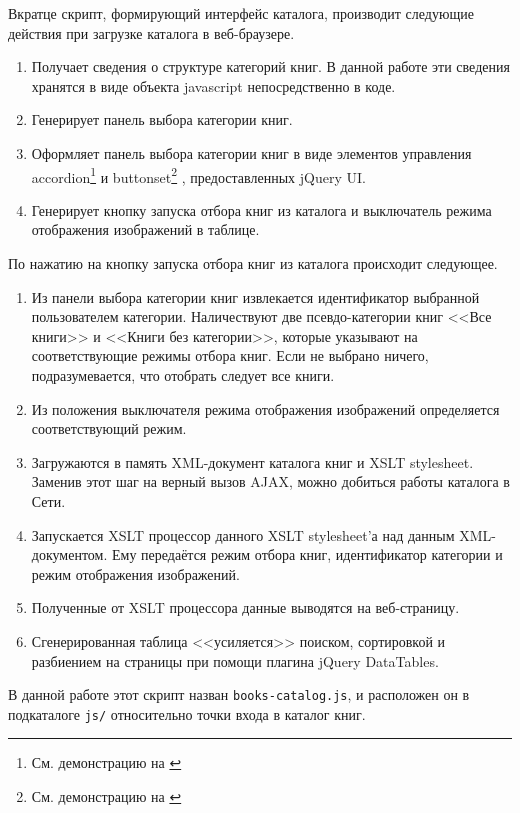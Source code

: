 \documentclass[a4paper,14pt,oneside]{extreport}
\begin{document}
Вкратце скрипт, формирующий интерфейс каталога, производит следующие действия при загрузке каталога в веб-браузере.
\begin{enumerate}
\item Получает сведения о структуре категорий книг. В данной работе эти сведения хранятся в виде объекта javascript непосредственно в коде.
\item Генерирует панель выбора категории книг.
\item Оформляет панель выбора категории книг в виде элементов управления accordion\footnote{См. демонстрацию на \cite{jQueryUI-accordion}} и buttonset\footnote{См. демонстрацию на \cite{jQueryUI-buttonset}} , предоставленных jQuery UI.
\item Генерирует кнопку запуска отбора книг из каталога и выключатель режима отображения изображений в таблице.
\end{enumerate}

По нажатию на кнопку запуска отбора книг из каталога происходит следующее.
\begin{enumerate}
\item Из панели выбора категории книг извлекается идентификатор выбранной пользователем категории. Наличествуют две псевдо-категории книг <<Все книги>> и <<Книги без категории>>, которые указывают на соответствующие режимы отбора книг. Если не выбрано ничего, подразумевается, что отобрать следует все книги. 
\item Из положения выключателя режима отображения изображений определяется соответствующий режим.
\item Загружаются в память XML-документ каталога книг и XSLT stylesheet. Заменив этот шаг на верный вызов AJAX, можно добиться работы каталога в Сети.
\item Запускается XSLT процессор данного XSLT stylesheet'а над данным XML-документом. Ему передаётся режим отбора книг, идентификатор категории и режим отображения изображений.
\item Полученные от XSLT процессора данные выводятся на веб-страницу.
\item Сгенерированная таблица <<усиляется>> поиском, сортировкой и разбиением на страницы при помощи плагина jQuery DataTables.
\end{enumerate}

В данной работе этот скрипт назван \verb'books-catalog.js', и расположен он в подкаталоге \verb'js/' относительно точки входа в каталог книг.
\end{document}
